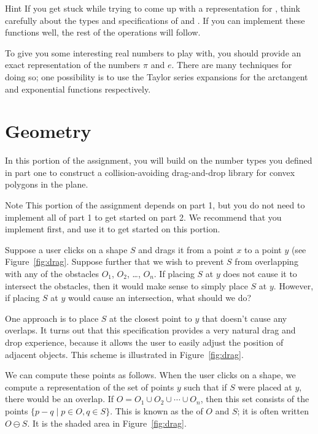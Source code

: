 \documentclass{pset}
\begin{document}
\begin{note}{Hint}
If you get stuck while trying to come up with a representation for
, think carefully about the types and specifications of
 and .  If you can implement these functions
well, the rest of the  operations will follow.
\end{note}

To give you some interesting real numbers to play with, you should provide an
exact representation of the numbers $\pi$ and $e$.  There are many techniques
for doing so; one possibility is to use the Taylor series expansions for the
arctangent and exponential functions respectively.

\part{Geometry}

In this portion of the assignment, you will build on the number types you
defined in part one to construct a collision-avoiding drag-and-drop library for
convex polygons in the plane.

\begin{note}{Note}
This portion of the assignment depends on part 1, but you do not need to
implement all of part 1 to get started on part 2.  We recommend that you
implement  first, and use it to get started on this
portion.
\end{note}

Suppose a user clicks on a shape $S$ and drags it from a point $x$ to a point
$y$ (see Figure~\ref{fig:drag}.  Suppose further that we wish to prevent $S$
from overlapping with any of the obstacles $O_1$, $O_2$, \dots, $O_n$.  If
placing $S$ at $y$ does not cause it to intersect the obstacles, then it would
make sense to simply place $S$ at $y$.  However, if placing $S$ at $y$ would
cause an intersection, what should we do?

One approach is to place $S$ at the closest point to $y$ that doesn't cause any
overlaps.  It turns out that this specification provides a very natural drag
and drop experience, because it allows the user to easily adjust the position
of adjacent objects.  This scheme is illustrated in Figure~\ref{fig:drag}.

We can compute these points as follows.  When the user clicks on a shape, we
compute a representation of the set of points $y$ such that if $S$ were placed
at $y$, there would be an overlap.  If $O = O_1 \cup O_2 \cup \cdots \cup
O_n$, then this set consists of the points $\{p - q \mid p \in O, q \in S\}$.
This is known as the
 of
$O$ and $S$; it is often written $O \ominus S$.  It is the shaded area in
Figure~\ref{fig:drag}.
\end{document}

